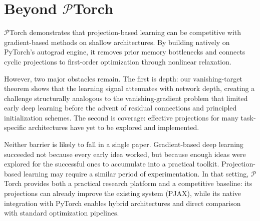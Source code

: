 \chapter{Beyond \texorpdfstring{$\mathcal{P}$Torch}{��Torch}}
$\mathcal{P}$Torch demonstrates that projection-based learning can be competitive with gradient-based methods on shallow architectures. By building natively on PyTorch's autograd engine, it removes prior memory bottlenecks and connects cyclic projections to first-order optimization through nonlinear relaxation.

However, two major obstacles remain. The first is depth: our vanishing-target theorem shows that the learning signal attenuates with network depth, creating a challenge structurally analogous to the vanishing-gradient problem that limited early deep learning before the advent of residual connections and principled initialization schemes. The second is coverage: effective projections for many task-specific architectures have yet to be explored and implemented.

Neither barrier is likely to fall in a single paper. Gradient-based deep learning succeeded not because every early idea worked, but because enough ideas were explored for the successful ones to accumulate into a practical toolkit. Projection-based learning may require a similar period of experimentation. In that setting, $\mathcal{P}$Torch provides both a practical research platform and a competitive baseline: its projections can already improve the existing system (PJAX), while its native integration with PyTorch enables hybrid architectures and direct comparison with standard optimization pipelines.
